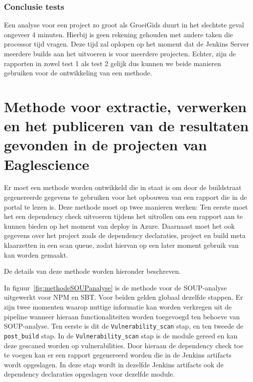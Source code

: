 
\subsubsection{Conclusie tests}
Een analyse voor een project zo groot als GroeiGids duurt in het slechtste geval ongeveer 4 minuten. Hierbij is geen rekening gehouden met andere taken die processor tijd vragen. Deze tijd zal oplopen op het moment dat de Jenkins Server meerdere builds aan het uitvoeren is voor meerdere projecten. Echter, zijn de rapporten in zowel test 1 als test 2 gelijk dus kunnen we beide manieren gebruiken voor de ontwikkeling van een methode.


\newpage


\section{Methode voor extractie, verwerken en het publiceren van de resultaten gevonden in de projecten van Eaglescience}\label{sec:methodesoupes}

Er moet een methode worden ontwikkeld die in staat is om door de buildstraat gegenereerde gegevens te gebruiken voor het opbouwen van een rapport die in de portal te lezen is.
Deze methode moet op twee manieren werken:
Ten eerste moet het een dependency check uitvoeren tijdens het uitrollen om een rapport aan te kunnen bieden op het moment van deploy in Azure. Daarnaast moet het ook gegevens over het project zoals de dependency declaraties, project en build meta klaarzetten in een scan queue, zodat hiervan op een later moment gebruik van kan worden gemaakt.

De details van deze methode worden hieronder beschreven.


In figuur~\ref{fig:methodeSOUPanalyse} is de methode voor de SOUP-analyse uitgewerkt voor NPM en SBT. Voor beiden gelden globaal dezelfde stappen. Er zijn twee momenten waarop nuttige informatie kan worden verkregen uit de pipeline wanneer hieraan functionaliteiten worden toegevoegd ten behoeve van SOUP-analyse. Ten eerste is dit de \texttt{Vulnerability\_scan} stap, en ten tweede de \texttt{post\_build} stap. In de \texttt{Vulnerability\_scan} stap is de module gereed en kan deze gescaned worden op vulnerabilities. Door hieraan de dependency check toe te voegen kan er een rapport gegenereerd worden die in de Jenkins artifacts wordt opgeslagen. In deze stap wordt in dezelfde Jenkins artifacts ook de dependency declaraties opgeslagen voor dezelfde module.

